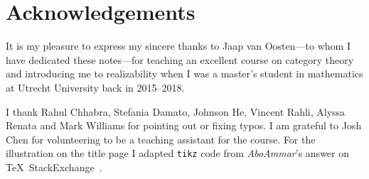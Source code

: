 \chapter{Acknowledgements}

It is my pleasure to express my sincere thanks to Jaap van Oosten---to whom I
have dedicated these notes---for teaching an excellent course on category
theory~\cite{vanOosten2016} and introducing me to realizability when I was a
master's student in mathematics at Utrecht University back in 2015--2018.

I thank Rahul Chhabra, Stefania Damato, Johnson He, Vincent Rahli, Alyssa Renata
and Mark Williams for pointing out or fixing typos.
%
I am grateful to Josh Chen for volunteering to be a teaching assistant for the
course.
%
For the illustration on the title page I adapted \verb|tikz| code from
\emph{AboAmmar}'s answer on \TeX\ StackExchange~\cite{latex-triangle}.

